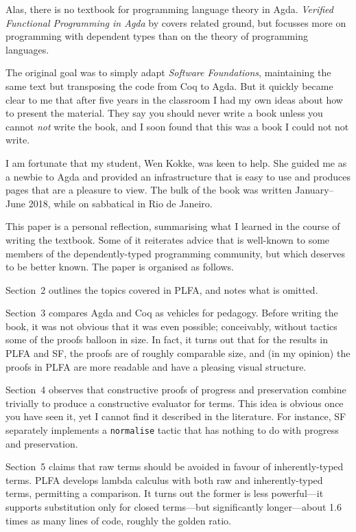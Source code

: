 \documentclass[runningheads]{llncs}
\begin{document}
Alas, there is no textbook for programming language theory in
Agda.  \emph{Verified Functional Programming in Agda} by \citep{Stump-2016}
covers related ground, but focusses more on programming with dependent
types than on the theory of programming languages.

The original goal was to simply adapt \emph{Software Foundations},
maintaining the same text but transposing the code from Coq to Agda.
But it quickly became clear to me that after five years in the
classroom I had my own ideas about how to present the material.  They
say you should never write a book unless you cannot \emph{not} write the
book, and I soon found that this was a book I could not not write.

I am fortunate that my student, Wen Kokke, was keen to help.  She
guided me as a newbie to Agda and provided an infrastructure that is
easy to use and produces pages that are a pleasure to view.
The bulk of the book was written January--June 2018, while on
sabbatical in Rio de Janeiro.

This paper is a personal reflection, summarising what I learned in the
course of writing the textbook. Some of it reiterates advice that is
well-known to some members of the dependently-typed programming
community, but which deserves to be better known.  The paper is
organised as follows.

Section~2 outlines the
topics covered in PLFA, and notes what is omitted.  

Section~3 compares Agda and Coq as vehicles for pedagogy.  Before
writing the book, it was not obvious that it was even possible;
conceivably, without tactics some of the proofs
balloon in size. In fact, it turns out that for the results in PLFA
and SF, the proofs are of roughly comparable size, and (in my opinion)
the proofs in PLFA are more readable and have a pleasing visual
structure.

Section~4 observes that constructive proofs of progress and
preservation combine trivially to produce a constructive evaluator for
terms.  This idea is obvious once you have seen it, yet I cannot
find it described in the literature.  For instance, SF separately
implements a \texttt{normalise} tactic that has nothing to do with
progress and preservation.

Section~5 claims that raw terms should be avoided in favour of
inherently-typed terms.  PLFA develops lambda calculus with both raw
and inherently-typed terms, permitting a comparison.  It turns out the
former is less powerful---it supports substitution only for closed
terms---but significantly longer---about 1.6 times as many lines of code,
roughly the golden ratio.
\end{document}
